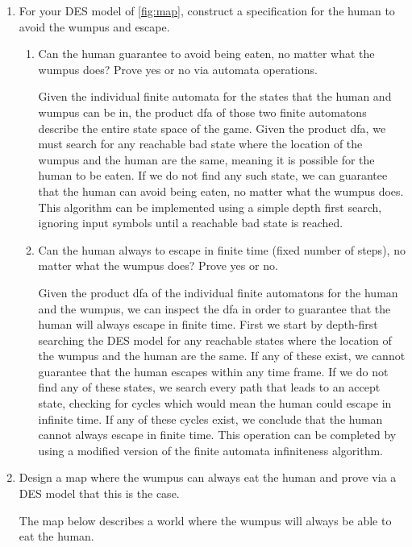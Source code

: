 \documentclass[12pt,letterpaper]{ntdhw}
\begin{document}
\begin{enumerate}
  \item For your DES model of \autoref{fig:map}, construct a specification
  for the human to avoid the wumpus and escape.
  \begin{enumerate}
    \item Can the human guarantee to avoid being eaten, no matter what
    the wumpus does?  Prove yes or no via automata operations.
    
    Given the individual finite automata for the states that the human and wumpus can be in, the product dfa of those two finite automatons describe the entire state space of the game. Given the product dfa, we must search for any reachable bad state where the location of the wumpus and the human are the same, meaning it is possible for the human to be eaten. If we do not find any such state, we can guarantee that the human can avoid being eaten, no matter what the wumpus does. This algorithm can be implemented using a simple depth first search, ignoring input symbols until a reachable bad state is reached.
    \item Can the human always to escape in finite time (fixed
    number of steps), no matter what the wumpus does?  Prove yes or
    no.

    Given the product dfa of the individual finite automatons for the human and the wumpus, we can inspect the dfa in order to guarantee that the human will always escape in finite time. First we start by depth-first searching the DES model for any reachable states where the location of the wumpus and the human are the same. If any of these exist, we cannot guarantee that the human escapes within any time frame. If we do not find any of these states, we search every path that leads to an accept state, checking for cycles which would mean the human could escape in infinite time. If any of these cycles exist, we conclude that the human cannot always escape in finite time. This operation can be completed by using a modified version of the finite automata infiniteness algorithm.
  \end{enumerate}

  \item Design a map where the wumpus can always eat the human and
  prove via a DES model that this is the case.

  The map below describes a world where the wumpus will always be able to eat the human.
  \begin{center}
  \label{fig:map3}
\end{center}


\end{enumerate}
\end{document}
